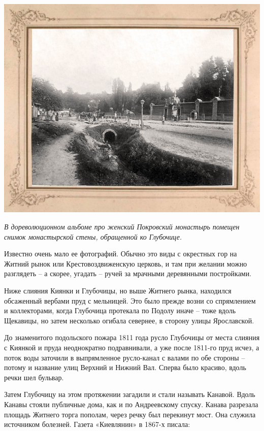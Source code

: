 \begin{center}
\includegraphics[width=\linewidth]{chast-colebanie-osnov/pochayna/glub-01.jpg}

\textit{В дореволюционном альбоме про женский Покровский монастырь помещен снимок монастырской стены, обращенной ко Глубочице.}
\end{center}

Известно очень мало ее фотографий. Обычно это виды с окрестных гор на Житний рынок или Крестовоздвиженскую церковь, и там при желании можно разглядеть – а скорее, угадать – ручей за мрачными деревянными постройками.
 
Ниже слияния Киянки и Глубочицы, но выше Житнего рынка, находился обсаженный вербами пруд с мельницей. Это было прежде возни со спрямлением и коллекторами, когда Глубочица протекала по Подолу иначе – тоже вдоль Щекавицы, но затем несколько огибала севернее, в сторону улицы Ярославской. 

До знаменитого подольского пожара 1811 года русло Глубочицы от места слияния с Киянкой и пруда неоднократно подравнивали, а уже после 1811-го пруд исчез, а поток воды заточили в выпрямленное русло-канал с валами по обе стороны – потому и название улиц Верхний и Нижний Вал. Сперва было красиво, вдоль речки шел бульвар.

Затем Глубочицу на этом протяжении загадили и стали называть Канавой. Вдоль Канавы стояли публичные дома, как и по Андреевскому спуску. Канава разрезала площадь Житнего торга пополам, через речку был перекинут мост. Она служила источником болезней. Газета «Киевлянин» в 1867-х писала:

